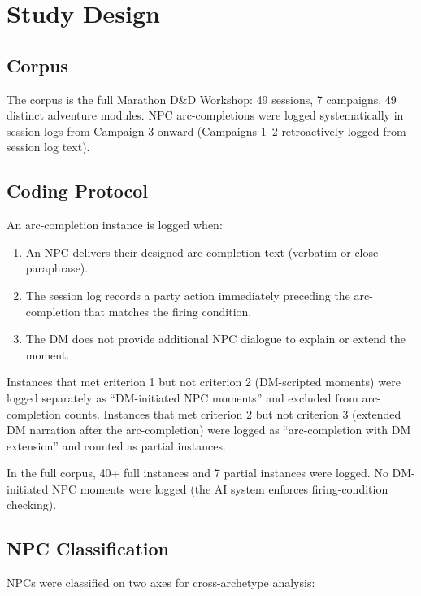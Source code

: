 
\section{Study Design}
\label{sec:study}

\subsection{Corpus}

The corpus is the full Marathon D\&D Workshop: 49 sessions, 7 campaigns, 49 distinct
adventure modules. NPC arc-completions were logged systematically in session logs
from Campaign 3 onward (Campaigns 1--2 retroactively logged from session log text).

\subsection{Coding Protocol}

An arc-completion instance is logged when:

\begin{enumerate}
  \item An NPC delivers their designed arc-completion text (verbatim or close paraphrase).
  \item The session log records a party action immediately preceding the arc-completion
    that matches the firing condition.
  \item The DM does not provide additional NPC dialogue to explain or extend the moment.
\end{enumerate}

Instances that met criterion 1 but not criterion 2 (DM-scripted moments) were logged
separately as ``DM-initiated NPC moments'' and excluded from arc-completion counts.
Instances that met criterion 2 but not criterion 3 (extended DM narration after the
arc-completion) were logged as ``arc-completion with DM extension'' and counted as
partial instances.

In the full corpus, 40+ full instances and 7 partial instances were logged. No DM-initiated
NPC moments were logged (the AI system enforces firing-condition checking).

\subsection{NPC Classification}

NPCs were classified on two axes for cross-archetype analysis:

